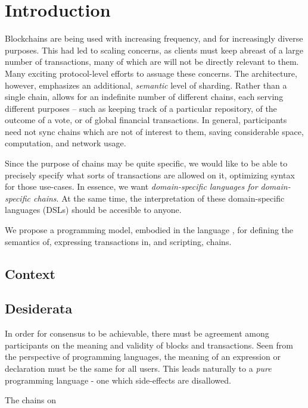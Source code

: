 \section{Introduction}
\label{s:introduction}

Blockchains are being used with increasing frequency, and for increasingly
diverse purposes. This had led to scaling concerns, as clients must keep
abreast of a large number of transactions, many of which are will not be
directly relevant to them. Many exciting protocol-level efforts to assuage
these concerns. The \oscoin{} architecture, however, emphasizes an additional,
\textit{semantic} level of sharding. Rather than a single chain, \oscoin{}
allows for an indefinite number of different chains, each serving different
purposes -- such as keeping track of a particular repository, of the outcome of
a vote, or of global financial transactions. In general, participants need not
sync chains which are not of interest to them, saving considerable space,
computation, and network usage.

Since the purpose of chains may be quite specific, we would like to be
able to precisely specify what sorts of transactions are allowed on it,
optimizing syntax for those use-cases. In essence, we want
\textit{domain-specific languages for domain-specific chains}. At the same
time, the interpretation of these domain-specific languages (DSLs) should be
accesible to anyone.

We propose a programming model, embodied in the language \rad, for defining the
semantics of, expressing transactions in, and scripting, chains.

\subsection{Context}

\subsection{Desiderata}

In order for consensus to be achievable, there must be agreement among
participants on the meaning and validity of blocks and transactions. Seen from
the perspective of programming languages, the meaning of an expression or
declaration must be the same for all users. This leads naturally to a
\textit{pure} programming language - one which side-effects are disallowed.

The chains on


